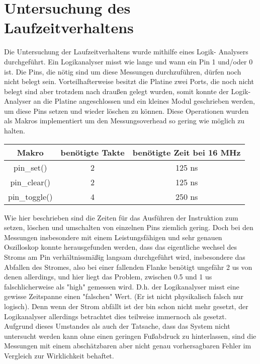 \chapter{Untersuchung des Laufzeitverhaltens}
Die Untersuchung der Laufzeitverhaltens wurde mithilfe eines Logik-
Analysers durchgeführt. Ein Logikanalyser misst wie lange und wann
ein Pin 1 und/oder 0 ist. Die Pins, die nötig sind um diese Messungen
durchzuführen, dürfen noch nicht belegt sein. Vorteilhafterweise
besitzt die Platine zwei Ports, die noch nicht belegt sind aber
trotzdem nach draußen gelegt wurden, somit konnte der Logik-
Analyser an die Platine angeschlossen und ein kleines Modul
geschrieben werden, um diese Pins setzen und wieder löschen zu
können. Diese Operationen wurden als Makros implementiert um den
Messungsoverhead so gering wie möglich zu halten.
\begin{center}
	\begin{tabular}{|c||c|c|}
		\hline
		\textbf{Makro} & \textbf{benötigte Takte} & \textbf{benötigte Zeit bei 16 MHz} \\ \hline \hline
		pin\_set() & 2 & 125 ns \\ \hline
		pin\_clear() & 2 & 125 ns \\ \hline
		pin\_toggle() & 4 & 250 ns \\ \hline
	\end{tabular}
\end{center}
Wie hier beschrieben sind die Zeiten für das Ausführen der Instruktion
zum setzen, löschen und umschalten von einzelnen Pins ziemlich gering.
Doch bei den Messungen insbesondere mit einem Leistungsfähigen und
sehr genauen Oszilloskop konnte herausgefunden werden, dass das eigentliche
wechsel des Stroms am Pin verhältnissmäßig langsam durchgeführt wird,
insbesondere das Abfallen des Stromes, also bei einer fallenden Flanke
benötigt ungefähr 2 us von denen allerdings, und hier liegt das Problem,
zwischen 0.5 und 1 us falschlicherweise als "high" gemessen wird.
D.h. der Logikanalyser misst eine gewisse Zeitspanne einen "falschen" Wert.
(Er ist nicht physikalisch falsch nur logisch). Denn wenn der Strom abfällt
ist der bin schon nicht mehr gesetzt, der Logikanalyser allerdings betrachtet
dies teilweise immernoch als gesetzt.
Aufgrund dieses Umstandes als auch der Tatsache, dass das System nicht untersucht
werden kann ohne einen geringen Fußabdruck zu hinterlassen, sind die Messungen mit
einem abschätzbaren aber nicht genau vorhersagbaren Fehler im Vergleich zur
Wirklichkeit behaftet.
